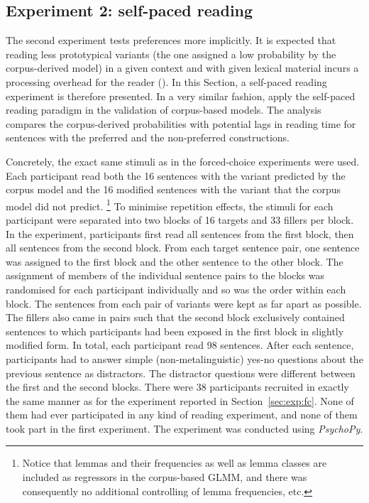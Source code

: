 \documentclass[USenglish]{article}
\begin{document}

\subsection{Experiment 2: self-paced reading}
\label{sec:exp:spr}

The second experiment tests preferences more implicitly.
It is expected that reading less prototypical variants (the one assigned a low probability by the corpus-derived model) in a given context and with given lexical material incurs a processing overhead for the reader (\citealp{Kaiser2013}).
In this Section, a self-paced reading experiment is therefore presented.
In a very similar fashion, \cite{DivjakEa2016} apply the self-paced reading paradigm in the validation of corpus-based models.
The analysis compares the corpus-derived probabilities with potential lags in reading time for sentences with the preferred and the non-preferred constructions.

Concretely, the exact same stimuli as in the forced-choice experiments were used.
Each participant read both the 16 sentences with the variant predicted by the corpus model and the 16 modified sentences with the variant that the corpus model did not predict.%
\footnote{Notice that lemmas and their frequencies as well as lemma classes are included as regressors in the corpus-based GLMM, and there was consequently no additional controlling of lemma frequencies, etc.}
To minimise repetition effects, the stimuli for each participant were separated into two blocks of 16 targets and 33 fillers per block.
In the experiment, participants first read all sentences from the first block, then all sentences from the second block.
From each target sentence pair, one sentence was assigned to the first block and the other sentence to the other block.
The assignment of members of the individual sentence pairs to the blocks was randomised for each participant individually and so was the order within each block.
The sentences from each pair of variants were kept as far apart as possible.
The fillers also came in pairs such that the second block exclusively contained sentences to which participants had been exposed in the first block in slightly modified form.
In total, each participant read 98 sentences.
After each sentence, participants had to answer simple (non-metalinguistic) yes-no questions about the previous sentence as distractors.
The distractor questions were different between the first and the second blocks.
There were 38 participants recruited in exactly the same manner as for the experiment reported in Section~\ref{sec:exp:fc}.
None of them had ever participated in any kind of reading experiment, and none of them took part in the first experiment.
The experiment was conducted using \textit{PsychoPy}.
\end{document}
